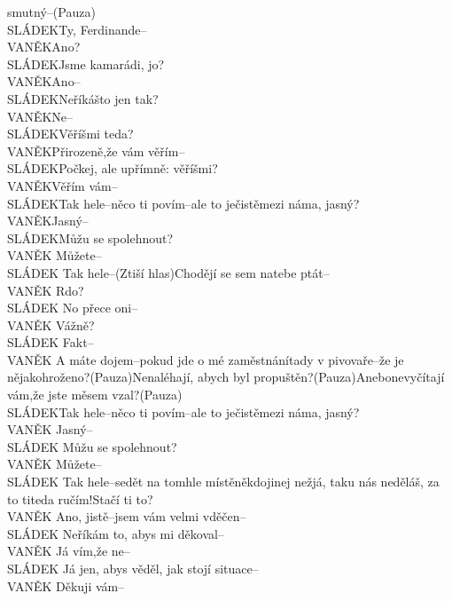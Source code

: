 \documentclass[11pt]{article}
\begin{document}
smutný–(Pauza)\\ SLÁDEKTy, Ferdinande–\\ VANĚKAno?\\ SLÁDEKJsme kamarádi, jo?\\ VANĚKAno–\\ SLÁDEKNeříkášto jen tak?\\ VANĚKNe–\\ SLÁDEKVěříšmi teda?\\ VANĚKPřirozeně,že vám věřím–\\ SLÁDEKPočkej, ale upřímně: věříšmi?\\ VANĚKVěřím vám–\\ SLÁDEKTak hele–něco ti povím–ale to ječistěmezi náma, jasný?
    \\ VANĚKJasný–\\ SLÁDEKMůžu se spolehnout?\\ VANĚK Můžete–\\ SLÁDEK Tak hele–(Ztiší hlas)Chodějí se sem natebe ptát–\\ VANĚK Rdo?\\ SLÁDEK No přece oni–\\ VANĚK Vážně?\\ SLÁDEK Fakt–\\ VANĚK  A  máte  dojem–pokud  jde  o  mé  zaměstnánítady  v  pivovaře–že  je  nějakohroženo?(Pauza)Nenaléhají,  abych  byl  propuštěn?(Pauza)Anebonevyčítají  vám,že jste měsem vzal?(Pauza)\\ SLÁDEKTak hele–něco ti povím–ale to ječistěmezi náma, jasný?\\ VANĚK Jasný–\\ SLÁDEK Můžu se spolehnout?\\ VANĚK Můžete–\\ SLÁDEK Tak hele–sedět na tomhle místěněkdojinej nežjá, taku nás neděláš, za to titeda ručím!Stačí ti to?\\ VANĚK Ano, jistě–jsem vám velmi vděčen–\\ SLÁDEK Neříkám to, abys mi děkoval–\\ VANĚK Já vím,že ne–\\ SLÁDEK Já jen, abys věděl, jak stojí situace–\\ VANĚK Děkuji vám–
\end{document}

